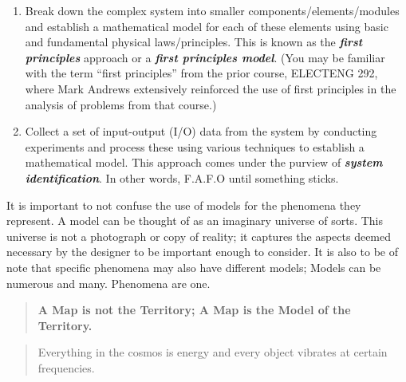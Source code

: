 \documentclass[
  14pt,
  a4paper,
  oneside,
  open=any,
  a4paper,
  14pt]{report}
\begin{document}
\begin{enumerate}
\def\labelenumi{\arabic{enumi}.}
\item
  Break down the complex system into smaller components/elements/modules
  and establish a mathematical model for each of these elements using
  basic and fundamental physical laws/principles. This is known as the
  \textbf{\emph{first principles}} approach or a \textbf{\emph{first
  principles model}}. (You may be familiar with the term ``first
  principles'' from the prior course, ELECTENG 292, where Mark Andrews
  extensively reinforced the use of first principles in the analysis of
  problems from that course.)
\item
  Collect a set of input-output (I/O) data from the system by conducting
  experiments and process these using various techniques to establish a
  mathematical model. This approach comes under the purview of
  \textbf{\emph{system identification}}. In other words, F.A.F.O until
  something sticks.
\end{enumerate}

\begin{tcolorbox}[enhanced jigsaw, colframe=quarto-callout-important-color-frame, coltitle=black, colback=white, breakable, titlerule=0mm, rightrule=.15mm, arc=.35mm, bottomtitle=1mm, opacityback=0, toptitle=1mm, title=\textcolor{quarto-callout-important-color}{\faExclamation}\hspace{0.5em}{Important}, colbacktitle=quarto-callout-important-color!10!white, bottomrule=.15mm, toprule=.15mm, leftrule=.75mm, left=2mm, opacitybacktitle=0.6]

It is important to not confuse the use of models for the phenomena they
represent. A model can be thought of as an imaginary universe of sorts.
This universe is not a photograph or copy of reality; it captures the
aspects deemed necessary by the designer to be important enough to
consider. It is also to be of note that specific phenomena may also have
different models; Models can be numerous and many. Phenomena are one.

\begin{quote}
\textbf{A Map is not the Territory; A Map is the Model of the
Territory.}
\end{quote}

\end{tcolorbox}

\begin{quote}
Everything in the cosmos is energy and every object vibrates at certain
frequencies.
\end{quote}
\end{document}

